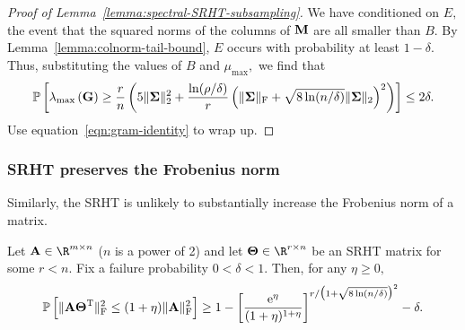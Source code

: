 \begin{proof}[Proof of Lemma~\ref{lemma:spectral-SRHT-subsampling}]
We have conditioned on $E,$ the event that the squared norms of the columns of ${\bm{\mathrm{M}}}$ are all smaller than $B.$ By Lemma~\ref{lemma:colnorm-tail-bound}, $E$ occurs with probability at least $1-\delta.$ Thus, substituting the values of $B$ and $\mu_{\text{max}},$ we find that
\[
 \mbox{}{\mathbb{P}}\left[ \lambda_{\mathrm{max}}\left({\bm{\mathrm{G}}}\right) \geq {r\over n} \left(5 \mbox{}\|{\bm{\mathrm{\Sigma}}}\|_2^2 + {\ln (\rho/\delta)\over r} \left( \mbox{}\|{\bm{\mathrm{\Sigma}}}\|_\mathrm{F} + \sqrt{8 \ln(n/\delta)} \mbox{}\|{\bm{\mathrm{\Sigma}}}\|_2 \right)^2 \right) \right]
\leq 2 \delta.
\]
Use equation~\eqref{eqn:gram-identity} to wrap up.
\end{proof}

\subsubsection{SRHT preserves the Frobenius norm}
Similarly, the SRHT is unlikely to substantially increase the Frobenius norm of a matrix.
\begin{lemma}
\label{lemma:frobenius-SRHT-subsampling}
 Let $\matA \in \R^{m \times n}$ ($n$ is a power of 2) and let $\matTh \in \R^{r \times n}$ be an SRHT matrix for some $r < n.$ Fix a failure probability $0 < \delta < 1.$ Then, for any $\eta \geq 0,$
\[
 \mbox{}{\mathbb{P}}\left[\mbox{}\|{\bm{\mathrm{A}}} {\bm{\mathrm{\Theta}}}^{\textsc{T}}\|_\mathrm{F}^2 \leq (1 + \eta) \mbox{}\|{\bm{\mathrm{A}}}\|_\mathrm{F}^2 \right] \geq 1- \left[ {{\mathrm e}^\eta\over (1+\eta)^{1+\eta}} \right]^{r/\big(1 + \sqrt{8 \ln(n/\delta)}\big)^2} - \delta.
\]
\end{lemma}

